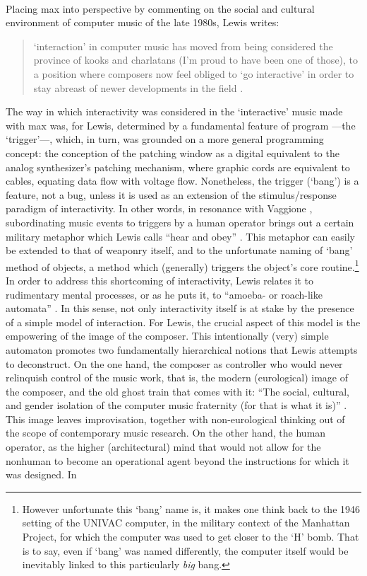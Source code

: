 \paragraph{}
Placing \gls{max} into perspective by commenting on the social and cultural environment of computer music of the late 1980s, Lewis writes:

\begin{quote}
	`interaction' in computer music has moved from being considered the province of kooks and charlatans (I'm proud to have been one of those), to a position where composers now feel obliged to `go interactive' in order to stay abreast of newer developments in the field \parencite[11]{Lew93:Put}.
\end{quote}

The way in which interactivity was considered in the `interactive' music made with \gls{max} was, for Lewis, determined by a fundamental feature of program ---the `trigger'---, which, in turn, was grounded on a more general programming concept: the conception of the patching window as a digital equivalent to the analog synthesizer's patching mechanism, where graphic cords are equivalent to cables, equating data flow with voltage flow. Nonetheless, the trigger (`bang') is a feature, not a bug, unless it is used as an extension of the stimulus/response paradigm of interactivity. In other words, in resonance with Vaggione , subordinating music events to triggers by a human operator brings out a certain military metaphor which Lewis calls ``hear and obey'' \parencite[11]{Lew93:Put}. This metaphor can easily be extended to that of weaponry itself, and to the unfortunate naming of `bang' method of objects, a method which (generally) triggers the object's core routine.\footnote{However unfortunate this `bang' name is, it makes one think back to the 1946 setting of the UNIVAC computer, in the military context of the Manhattan Project, for which the computer was used to get closer to the `H' bomb. That is to say, even if `bang' was named differently, the computer itself would be inevitably linked to this particularly \textit{big} bang.} In order to address this shortcoming of interactivity, Lewis relates it to rudimentary mental processes, or as he puts it, to ``amoeba- or roach-like automata'' \parencite[11]{Lew93:Put}. In this sense, not only interactivity itself is at stake by the presence of a simple model of interaction. For Lewis, the crucial aspect of this model is the empowering of the image of the composer. This intentionally (very) simple automaton promotes two fundamentally hierarchical notions that Lewis attempts to deconstruct. On the one hand, the composer as controller who would never relinquish control of the music work, that is, the modern (eurological) image of the composer, and the old ghost train that comes with it: ``The social, cultural, and gender isolation of the computer music fraternity (for that is what it is)'' \parencite[11]{Lew93:Put}. This image leaves improvisation, together with non-eurological thinking out of the scope of contemporary music research. On the other hand, the human operator, as the higher (architectural) mind that would not allow for the nonhuman to become an operational agent beyond the instructions for which it was designed. In 